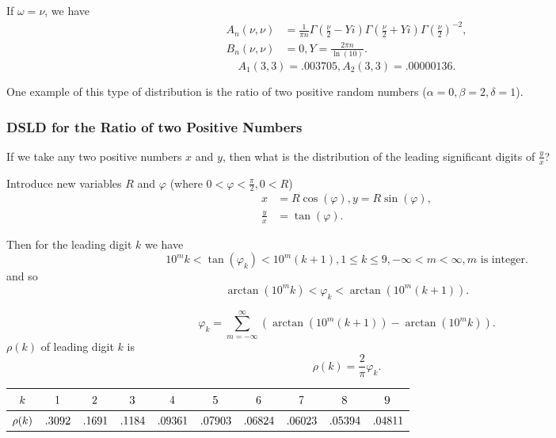 \documentclass[titlepage,fleqn]{article}%
\begin{document}
\begin{itemize}
If $\omega=\nu$, we have%
\begin{align*}
A_{n}(\nu,\nu)  &  =\frac{1}{\pi n}\Gamma\left(  \frac{\nu}{2}-Yi\right)
\Gamma\left(  \frac{\nu}{2}+Yi\right)  \Gamma\left(  \frac{\nu}{2}\right)
^{-2},\\
B_{n}(\nu,\nu)  &  =0,Y=\frac{2\pi n}{\ln(10)}.
\end{align*}%
\begin{equation}
A_{1}(3,3)=.003705,A_{2}(3,3)=.00000136.
\end{equation}

\end{itemize}

One example of this type of distribution is the ratio of two positive random
numbers ($\alpha=0,\beta=2,\delta=1$).

\subsubsection{DSLD for the Ratio of two Positive Numbers}%

\label{DofLD2P}%


If we take any two positive numbers $x$ and $y$, then what is the distribution
of the leading significant digits of $\frac{y}{x}$?

Introduce new variables $R$ and $\varphi$ (where $0<\varphi<\frac{\pi}{2}%
,0<R$)
\begin{align*}
x  &  =R\cos(\varphi),y=R\sin(\varphi),\\
\frac{y}{x}  &  =\tan(\varphi).
\end{align*}


Then for the leading digit $k$ we have%
\[
10^{m}k<\tan(\varphi_{k})<10^{m}(k+1),1\leq k\leq9,-\infty<m<\infty,m\text{ is
integer.}%
\]
and so%
\[
\arctan(10^{m}k)<\varphi_{k}<\arctan(10^{m}(k+1)).
\]
%

\begin{equation}
\varphi_{k}=%
{\displaystyle\sum\limits_{m=-\infty}^{\infty}}
\left(  \arctan(10^{m}(k+1))-\arctan(10^{m}k)\right)  . \label{Prob0}%
\end{equation}
$\rho(k)$ of leading digit $k$ is%
\begin{equation}
\rho(k)=\frac{2}{\pi}\varphi_{k}. \label{Prob1}%
\end{equation}
%

\begin{tabular}
[c]{|c|c|c|c|c|c|c|c|c|c|}\hline\hline
${\small k}$ & ${\small 1}$ & ${\small 2}$ & ${\small 3}$ & ${\small 4}$ &
${\small 5}$ & ${\small 6}$ & ${\small 7}$ & ${\small 8}$ & ${\small 9}%
$\\\hline
${\small \rho(k)}$ & ${\small .3092}$ & ${\small .1691}$ & ${\small .1184}$ &
${\small .09361}$ & ${\small .07903}$ & ${\small .06824}$ & ${\small .06023}$
& ${\small .05394}$ & ${\small .04811}$\\\hline\hline
\end{tabular}
\end{document}
